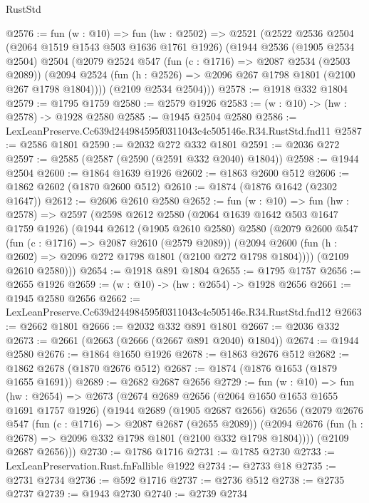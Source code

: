 \begin{lexlean}{RustStd}
\begin{coremodule}
@2576 := fun (w : @10) =>
  fun (hw : @2502) =>
  @2521
    (@2522
      @2536
      @2504
      (@2064 @1519 @1543 @503 @1636 @1761 @1926)
      (@1944
        @2536
        (@1905 @2534 @2504)
        @2504
        (@2079
          @2524
          @547
          (fun (c : @1716) => @2087 @2534 (@2503 @2089))
          (@2094 @2524 (fun (h : @2526) => @2096 @267 @1798 @1801 (@2100 @267 @1798 @1804))))
        (@2109 @2534 @2504)))
@2578 := @1918 @332 @1804
@2579 := @1795 @1759
@2580 := @2579 @1926
@2583 := (w : @10) -> (hw : @2578) -> @1928 @2580
@2585 := @1945 @2504 @2580
@2586 := LexLeanPreserve.Cc639d244984595f0311043c4c505146e.R34.RustStd.fnd11
@2587 := @2586 @1801
@2590 := @2032 @272 @332 @1801
@2591 := @2036 @272
@2597 := @2585 (@2587 (@2590 (@2591 @332 @2040) @1804))
@2598 := @1944 @2504
@2600 := @1864 @1639 @1926
@2602 := @1863 @2600 @512
@2606 := @1862 @2602 (@1870 @2600 @512)
@2610 := @1874 (@1876 @1642 (@2302 @1647))
@2612 := @2606 @2610 @2580
@2652 := fun (w : @10) =>
  fun (hw : @2578) =>
  @2597
    (@2598
      @2612
      @2580
      (@2064 @1639 @1642 @503 @1647 @1759 @1926)
      (@1944
        @2612
        (@1905 @2610 @2580)
        @2580
        (@2079
          @2600
          @547
          (fun (c : @1716) => @2087 @2610 (@2579 @2089))
          (@2094 @2600 (fun (h : @2602) => @2096 @272 @1798 @1801 (@2100 @272 @1798 @1804))))
        (@2109 @2610 @2580)))
@2654 := @1918 @891 @1804
@2655 := @1795 @1757
@2656 := @2655 @1926
@2659 := (w : @10) -> (hw : @2654) -> @1928 @2656
@2661 := @1945 @2580 @2656
@2662 := LexLeanPreserve.Cc639d244984595f0311043c4c505146e.R34.RustStd.fnd12
@2663 := @2662 @1801
@2666 := @2032 @332 @891 @1801
@2667 := @2036 @332
@2673 := @2661 (@2663 (@2666 (@2667 @891 @2040) @1804))
@2674 := @1944 @2580
@2676 := @1864 @1650 @1926
@2678 := @1863 @2676 @512
@2682 := @1862 @2678 (@1870 @2676 @512)
@2687 := @1874 (@1876 @1653 (@1879 @1655 @1691))
@2689 := @2682 @2687 @2656
@2729 := fun (w : @10) =>
  fun (hw : @2654) =>
  @2673
    (@2674
      @2689
      @2656
      (@2064 @1650 @1653 @1655 @1691 @1757 @1926)
      (@1944
        @2689
        (@1905 @2687 @2656)
        @2656
        (@2079
          @2676
          @547
          (fun (c : @1716) => @2087 @2687 (@2655 @2089))
          (@2094 @2676 (fun (h : @2678) => @2096 @332 @1798 @1801 (@2100 @332 @1798 @1804))))
        (@2109 @2687 @2656)))
@2730 := @1786 @1716
@2731 := @1785 @2730
@2733 := LexLeanPreservation.Rust.fnFallible @1922
@2734 := @2733 @18
@2735 := @2731 @2734
@2736 := @592 @1716
@2737 := @2736 @512
@2738 := @2735 @2737
@2739 := @1943 @2730
@2740 := @2739 @2734

\end{coremodule}
\end{lexlean}
